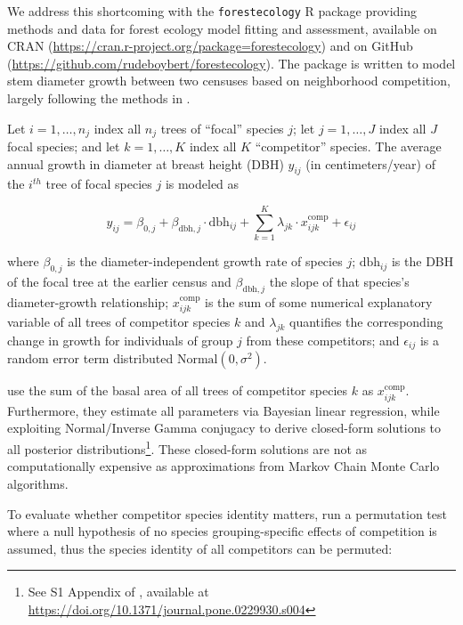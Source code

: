\documentclass[12pt]{article}
\begin{document}
We address this shortcoming with the \texttt{forestecology} R package
providing methods and data for forest ecology model fitting and
assessment, available on CRAN
(\url{https://cran.r-project.org/package=forestecology}) and on GitHub
(\url{https://github.com/rudeboybert/forestecology}). The package is
written to model stem diameter growth between two censuses based on
neighborhood competition, largely following the methods in
\citet{allen_permutation_2020}.

Let \(i = 1, \ldots, n_j\) index all \(n_j\) trees of ``focal'' species
\(j\); let \(j = 1, \ldots, J\) index all \(J\) focal species; and let
\(k = 1, \ldots, K\) index all \(K\) ``competitor'' species. The average
annual growth in diameter at breast height (DBH) \(y_{ij}\) (in
centimeters/year) of the \(i^{th}\) tree of focal species \(j\) is
modeled as

\begin{equation}
\label{eq:model}
y_{ij} = \beta_{0,j} + \beta_{\text{dbh},j} \cdot \text{dbh}_{ij} + \sum_{k=1}^{K} \lambda_{jk} \cdot x^{\text{comp}}_{ijk} + \epsilon_{ij}
\end{equation}

where \(\beta_{0,j}\) is the diameter-independent growth rate of species
\(j\); \(\text{dbh}_{ij}\) is the DBH of the focal tree at the earlier
census and \(\beta_{\text{dbh},j}\) the slope of that species's
diameter-growth relationship; \(x^{\text{comp}}_{ijk}\) is the sum of
some numerical explanatory variable of all trees of competitor species
\(k\) and \(\lambda_{jk}\) quantifies the corresponding change in growth
for individuals of group \(j\) from these competitors; and
\(\epsilon_{ij}\) is a random error term distributed
\(\text{Normal}(0, \sigma^2)\).

\citet{allen_permutation_2020} use the sum of the basal area of all
trees of competitor species \(k\) as \(x^{\text{comp}}_{ijk}\).
Furthermore, they estimate all parameters via Bayesian linear
regression, while exploiting Normal/Inverse Gamma conjugacy to derive
closed-form solutions to all posterior distributions\footnote{See S1
  Appendix of \citet{allen_permutation_2020}, available at
  \url{https://doi.org/10.1371/journal.pone.0229930.s004}}. These
closed-form solutions are not as computationally expensive as
approximations from Markov Chain Monte Carlo algorithms.

To evaluate whether competitor species identity matters,
\citet{allen_permutation_2020} run a permutation test where a null
hypothesis of no species grouping-specific effects of competition is
assumed, thus the species identity of all competitors can be permuted:
\end{document}
